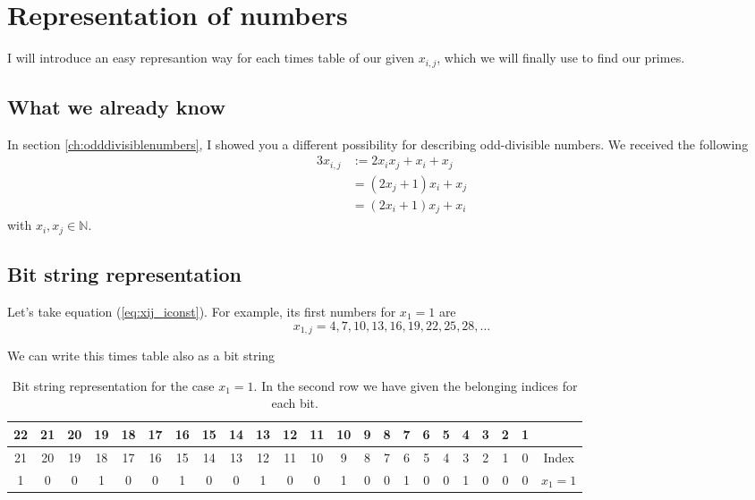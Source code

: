 \chapter{Representation of numbers}
\label{ch:representationofnumbers}
\minitoc
I will introduce an easy represantion way for each times table of our given $x_{i,j}$, which we will finally use to find our primes.
\section{What we already know}
\label{s:whatwealreadyknow}
In section \ref{ch:odddivisiblenumbers}, I showed you a different possibility for describing odd-divisible numbers. We received the following
\begin{alignat}{3}
	x_{i,j} &:= 2x_{i}x_{j} + x_{i} + x_{j} \label{eq:xij_gen} \\
	&= \left(2x_{j} + 1\right)x_{i} + x_{j} \label{eq:xij_jconst} \\
	&= \left(2x_{i} + 1\right)x_{j} + x_{i} \label{eq:xij_iconst}	
\end{alignat}
with $x_{i}, x_{j} \in \mathbb{N}$.
\section{Bit string representation}
\label{s:bitstringrepresantion}
Let's take equation (\ref{eq:xij_iconst}). For example, its first numbers for $x_{1} = 1$ are
\begin{equation}
	x_{1,j} = 4, 7, 10, 13, 16, 19, 22, 25, 28, \dots
\label{eq:xi1_firstnumbers}\end{equation}

We can write this times table also as a bit string

\begin{table}[H]
\centering
\caption{Bit string representation for the case $x_{1} = 1$. In the second row we have given the belonging indices for each bit.}
\tiny
\begin{tabular}{cccccccccccccccccccccc||c}
				\cellcolor{yellow} 22 & 21 & 20 & \cellcolor{yellow} 19 & 18 & 17 & \cellcolor{yellow} 16 & 15 & 14 & \cellcolor{yellow} 13 & 12 & 11 & \cellcolor{yellow} 10 & 9 & 8 & \cellcolor{yellow} 7 & 6 & 5 & \cellcolor{yellow} 4 & 3 & 2 & 1 & \\
\hline				21 & 20 & 19 & 18 & 17 & 16 & 15 & 14 & 13 & 12 & 11 & 10 & 9  & 8 & 7 & 6 & 5 & 4 & 3 & 2 & 1 & 0 & Index \\
\hline\hline \rowcolor{green}	\cellcolor{red} 1 &  0 &  0 &  \cellcolor{red} 1 &  0 &  0 & \cellcolor{red} 1 &  0 &  0 & \cellcolor{red} 1 &  0 &  0 & \cellcolor{red} 1 & 0 & 0 & \cellcolor{red} 1 & 0 & 0 & \cellcolor{red} 1 & 0 & 0 & 0 & $x_{1} = 1$
\end{tabular}
\label{tab:bitstringx1_1}
\end{table}

